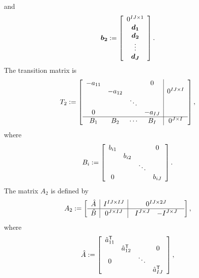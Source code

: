 and
\begin{equation*}
\mathbf{\boldsymbol{b_2}}:= \left[\begin{array}{c}
		0^{IJ \times 1}\\
		\mathbf{\boldsymbol{d_1}}\\
		\mathbf{\boldsymbol{d_2}}\\
		\vdots\\
		\mathbf{\boldsymbol{d_J}}
	\end{array}\right].
\end{equation*}
The transition matrix is
\begin{equation*}
T_2:= \left[ \begin{array}{cccc|c}
	-a_{11} & & & 0 & \\
	      & -a_{12} & & & 0^{IJ \times I}\\
	& & \ddots & & \\
	 0& & & -a_{IJ} & \\ \hline
	B_1 & B_2 & \cdots & B_I	& 0^{J \times I}
	\end{array} \right],
\end{equation*}
where
\begin{equation*}
B_i := \left[\begin{array}{cccc}
	b_{i1} & & & 0\\
    & b_{i2} & &\\
	& & \ddots & \\
	 0& & & b_{iJ}
	\end{array} \right].
\end{equation*}
The matrix $A_2$ is defined by
\begin{equation*}
A_2:= \left[\begin{array}{c|c|c}
		\hat{A} & I^{IJ \times IJ} & 0^{IJ \times 2J}\\
		\hline
		\hat{B} & 0^{J \times IJ} & \begin{array}{cc} I^{J\times J} & -I^{J\times J}\end{array}
		\end{array} \right],
\end{equation*}
where
\begin{equation*}
\hat{A} :=
 \left[
\begin{array}{cccc}
	\hat{a}_{11}^{\mbox{\scriptsize\sf T}}
	& & &\\
	& 
	\hat{a}_{12}^{\mbox{\scriptsize\sf T}}
	 & & 0\\
	0 &  & \ddots &\\
	& & & 
	\hat{a}_{IJ}^{\mbox{\scriptsize\sf T}} 
\end{array} \right],
\end{equation*}
